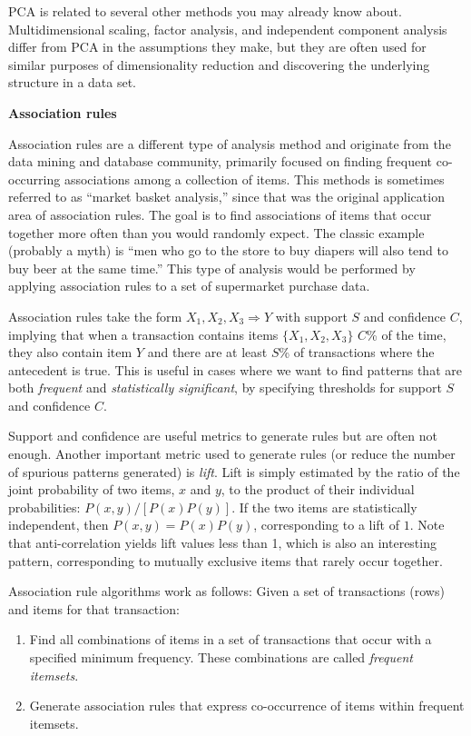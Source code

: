 \documentclass[]{krantz}
\begin{document}
PCA is related to several other methods you may already know about.
Multidimensional scaling, factor analysis, and independent component
analysis differ from PCA in the assumptions they make, but they are
often used for similar purposes of dimensionality reduction and
discovering the underlying structure in a data set.

\textbf{Association rules}

Association rules are a different type of analysis method and originate
from the data mining and database community, primarily focused on
finding frequent co-occurring associations among a collection of items.
This methods is sometimes referred to as ``market basket analysis,''
since that was the original application area of association rules. The
goal is to find associations of items that occur together more often
than you would randomly expect. The classic example (probably a myth) is
``men who go to the store to buy diapers will also tend to buy beer at
the same time.'' This type of analysis would be performed by applying
association rules to a set of supermarket purchase data.

Association rules take the form \(X_1, X_2, X_3 \Rightarrow Y\) with
support \(S\) and confidence \(C\), implying that when a transaction
contains items \(\{X_1, X_2, X_3\}\) \(C\)\% of the time, they also
contain item \(Y\) and there are at least \(S\)\% of transactions where
the antecedent is true. This is useful in cases where we want to find
patterns that are both \emph{frequent} and \emph{statistically
significant}, by specifying thresholds for support \(S\) and confidence
\(C\).

Support and confidence are useful metrics to generate rules but are
often not enough. Another important metric used to generate rules (or
reduce the number of spurious patterns generated) is \emph{lift}. Lift
is simply estimated by the ratio of the joint probability of two items,
\(x\) and \(y\), to the product of their individual probabilities:
\(P(x,y)/[P(x)P(y)]\). If the two items are statistically independent,
then \(P(x,y)=P(x)P(y)\), corresponding to a lift of \(1\). Note that
anti-correlation yields lift values less than 1, which is also an
interesting pattern, corresponding to mutually exclusive items that
rarely occur together.

Association rule algorithms work as follows: Given a set of transactions
(rows) and items for that transaction:

\begin{enumerate}
\def\labelenumi{\arabic{enumi}.}
\item
  Find all combinations of items in a set of transactions that occur
  with a specified minimum frequency. These combinations are called
  \emph{frequent itemsets}.
\item
  Generate association rules that express co-occurrence of items within
  frequent itemsets.
\end{enumerate}
\end{document}
